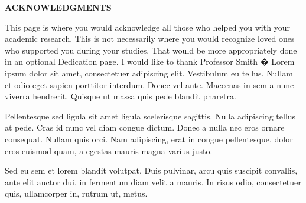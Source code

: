\newpage
{}
\setcounter{page}{2}

\centerline{\bf \large ACKNOWLEDGMENTS}
\vskip 10mm %
This page is where you would acknowledge all those who helped you with your academic research. This is not necessarily where you would recognize loved ones who supported you during your studies. That would be more appropriately done in an optional Dedication page. I would like to thank Professor Smith � Lorem ipsum dolor sit amet, consectetuer adipiscing elit. Vestibulum eu tellus. Nullam et odio eget sapien porttitor interdum. Donec vel ante. Maecenas in sem a nunc viverra hendrerit. Quisque ut massa quis pede blandit pharetra. \par
Pellentesque sed ligula sit amet ligula scelerisque sagittis. Nulla adipiscing tellus at pede. Cras id nunc vel diam congue dictum. Donec a nulla nec eros ornare consequat. Nullam quis orci. Nam adipiscing, erat in congue pellentesque, dolor eros euismod quam, a egestas mauris magna varius justo. \par
Sed eu sem et lorem blandit volutpat. Duis pulvinar, arcu quis suscipit convallis, ante elit auctor dui, in fermentum diam velit a mauris. In risus odio, consectetuer quis, ullamcorper in, rutrum ut, metus.
